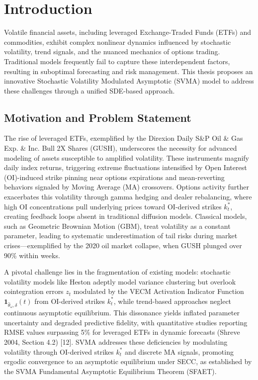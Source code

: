 \documentclass[12pt]{report}
\begin{document}
\chapter{Introduction}

Volatile financial assets, including leveraged Exchange-Traded Funds (ETFs) and commodities, exhibit complex nonlinear dynamics influenced by stochastic volatility, trend signals, and the nuanced mechanics of options trading. Traditional models frequently fail to capture these interdependent factors, resulting in suboptimal forecasting and risk management. This thesis proposes an innovative Stochastic Volatility Modulated Asymptotic (SVMA) model to address these challenges through a unified SDE-based approach.

\section{Motivation and Problem Statement}

The rise of leveraged ETFs, exemplified by the Direxion Daily S\&P Oil \& Gas Exp. \& Inc. Bull 2X Shares (GUSH), underscores the necessity for advanced modeling of assets susceptible to amplified volatility. These instruments magnify daily index returns, triggering extreme fluctuations intensified by Open Interest (OI)-induced strike pinning near options expirations and mean-reverting behaviors signaled by Moving Average (MA) crossovers. Options activity further exacerbates this volatility through gamma hedging and dealer rebalancing, where high OI concentrations pull underlying prices toward OI-derived strikes \(k_t^*\), creating feedback loops absent in traditional diffusion models. Classical models, such as Geometric Brownian Motion (GBM), treat volatility as a constant parameter, leading to systematic underestimation of tail risks during market crises—exemplified by the 2020 oil market collapse, when GUSH plunged over 90\% within weeks.

\vspace{0.2in}

A pivotal challenge lies in the fragmentation of existing models: stochastic volatility models like Heston adeptly model variance clustering but overlook cointegration errors \(z_t\) modulated by the VECM Activation Indicator Function \(\mathbf{1}_{\hat{\theta}_\omega, \delta}(t)\) from OI-derived strikes \(k_t^*\), while trend-based approaches neglect continuous asymptotic equilibrium. This dissonance yields inflated parameter uncertainty and degraded predictive fidelity, with quantitative studies reporting RMSE values surpassing 5\% for leveraged ETFs in dynamic forecasts (Shreve 2004, Section 4.2) [12]. SVMA addresses these deficiencies by modulating volatility through OI-derived strikes \(k_t^*\) and discrete MA signals, promoting ergodic convergence to an asymptotic equilibrium under SECC, as established by the SVMA Fundamental Asymptotic Equilibrium Theorem (SFAET).
\end{document}
